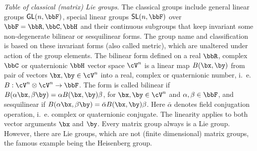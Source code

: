 \begin{unit}
\textit{Table of classical (matrix) Lie groups}.\label{classgroup}
The classical groups include general linear groups
$\mathsf{GL}(n,\bbF)$, special linear groups $\mathsf{SL}(n,\bbF)$
over $\bbF=\bbR,\bbC,\bbH$ and their continuous subgroups that
keep invariant some non-degenerate bilinear or sesquilinear forms.
The group name and classification is based on these invariant forms
(also called metric), which are unaltered under action of the
group elements. The bilinear form defined on a real $\bbR$,
complex $\bbC$ or quaternionic $\bbH$ vector space  $\cV^n$ is a
linear map $B(\bx,\by)$ from pair of vectors $\bx,\by\in\cV^n$
into a real, complex or quaternionic number, i.~e. $B:
\cV^n\otimes\cV^n \rightarrow \bbF$. The form is called bilinear
if $B(\alpha\bx,\beta\by)=\alpha B(\bx,\by)\beta$, for
$\bx,\by\in\cV^n$ and $\alpha,\beta\in\bbF$, and sesquilinear if
$B(\alpha\bx,\beta\by)=\bar\alpha B(\bx,\by)\beta$. Here
$\bar\alpha$ denotes field conjugation operation, i.~e. complex or
quaternionic conjugate. The linearity applies to both vector
arguments $\bx$ and $\by$. Every matrix group always is a Lie
group. However, there are Lie groups, which are not (finite
dimensional) matrix groups, the famous example being the
Heisenberg group.



\end{unit}
